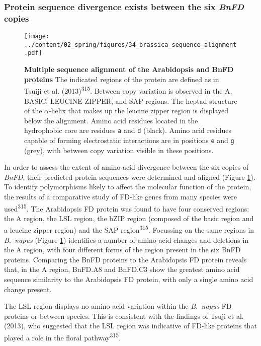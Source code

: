 \documentclass[12pt,]{book}
\begin{document}
\subsubsection{\texorpdfstring{Protein sequence divergence exists
between the six \emph{BnFD}
copies}{Protein sequence divergence exists between the six BnFD copies}}\label{section:spring:bnafddivergence}

\begin{figure}[htbp]
\centering
\texttt{[image: ../content/02\_spring/figures/34\_brassica\_sequence\_alignment.pdf]}
\caption{\textbf{Multiple sequence alignment of the Arabidopsis and BnFD
proteins} The indicated regions of the protein are defined as in Tsuiji
et al. (2013)\textsuperscript{315}. Between copy variation is observed
in the A, BASIC, LEUCINE ZIPPER, and SAP regions. The heptad structure
of the \(\alpha\)-helix that makes up the leucine zipper region is
displayed below the alignment. Amino acid residues located in the
hydrophobic core are residues \texttt{a} and \texttt{d} (black). Amino
acid residues capable of forming electrostatic interactions are in
positions \texttt{e} and \texttt{g} (grey), with between copy variation
visible in these positions.}\label{figure:234:brassicasequence}
\end{figure}

In order to assess the extent of amino acid divergence between the six
copies of \emph{BnFD}, their predicted protein sequences were determined
and aligned (Figure \ref{figure:234:brassicasequence}). To identify
polymorphisms likely to affect the molecular function of the protein,
the results of a comparative study of FD-like genes from many species
were used\textsuperscript{315}. The Arabidopsis FD protein was found to
have four conserved regions: the A region, the LSL region, the bZIP
region (composed of the basic region and a leucine zipper region) and
the SAP region\textsuperscript{315}. Focussing on the same regions in
\emph{B.~napus} (Figure \ref{figure:234:brassicasequence}) identifies a
number of amino acid changes and deletions in the A region, with four
different forms of the region present in the six BnFD proteins.
Comparing the BnFD proteins to the Arabidopsis FD protein reveals that,
in the A region, BnFD.A8 and BnFD.C3 show the greatest amino acid
sequence similarity to the Arabidopsis FD protein, with only a single
amino acid change present.

The LSL region displays no amino acid variation within the
\emph{B.~napus} FD proteins or between species. This is consistent with
the findings of Tsuji et al. (2013), who suggested that the LSL region
was indicative of FD-like proteins that played a role in the floral
pathway\textsuperscript{315}.
\end{document}
